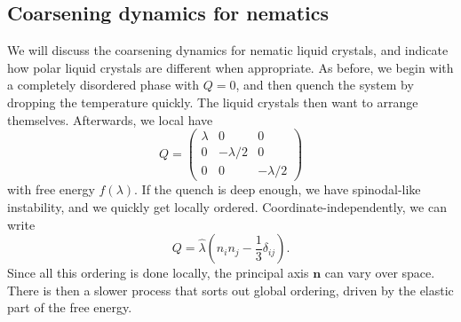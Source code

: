 \documentclass[a4paper]{article}
\begin{document}
\subsection{Coarsening dynamics for nematics}
We will discuss the coarsening dynamics for nematic liquid crystals, and indicate how polar liquid crystals are different when appropriate. As before, we begin with a completely disordered phase with $Q = 0$, and then quench the system by dropping the temperature quickly. The liquid crystals then want to arrange themselves. Afterwards, we local have
\[
  Q = 
  \begin{pmatrix}
    \lambda & 0 & 0\\
    0 & - \lambda/2 & 0\\
    0 & 0 & -\lambda/2
  \end{pmatrix}
\]
with free energy $f(\lambda)$. If the quench is deep enough, we have spinodal-like instability, and we quickly get locally ordered. Coordinate-independently, we can write
\[
  Q = \hat{\lambda} \left(n_i n_j - \frac{1}{3} \delta_{ij}\right).
\]
Since all this ordering is done locally, the principal axis $\mathbf{n}$ can vary over space. There is then a slower process that sorts out global ordering, driven by the elastic part of the free energy.

%
\end{document}
